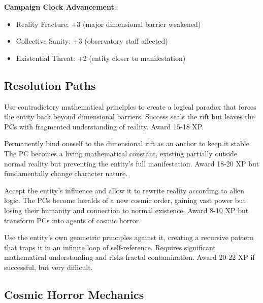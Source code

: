 \documentclass[11pt]{article}
\begin{document}
\textbf{Campaign Clock Advancement}:
\begin{itemize}[leftmargin=*]
\item Reality Fracture: +3 (major dimensional barrier weakened)
\item Collective Sanity: +3 (observatory staff affected)
\item Existential Threat: +2 (entity closer to manifestation)
\end{itemize}

\subsection*{Resolution Paths}

\begin{description}[leftmargin=*]
\item[The Paradox Seal] Use contradictory mathematical principles to create a logical paradox that forces the entity back beyond dimensional barriers. Success seals the rift but leaves the PCs with fragmented understanding of reality. Award 15-18 XP.
\item[The Sacrificial Equation] Permanently bind oneself to the dimensional rift as an anchor to keep it stable. The PC becomes a living mathematical constant, existing partially outside normal reality but preventing the entity's full manifestation. Award 18-20 XP but fundamentally change character nature.
\item[The Embrace of Infinity] Accept the entity's influence and allow it to rewrite reality according to alien logic. The PCs become heralds of a new cosmic order, gaining vast power but losing their humanity and connection to normal existence. Award 8-10 XP but transform PCs into agents of cosmic horror.
\item[The Fractal Escape] Use the entity's own geometric principles against it, creating a recursive pattern that traps it in an infinite loop of self-reference. Requires significant mathematical understanding and risks fractal contamination. Award 20-22 XP if successful, but very difficult.
\end{description}

\subsection*{Cosmic Horror Mechanics}
\end{document}
